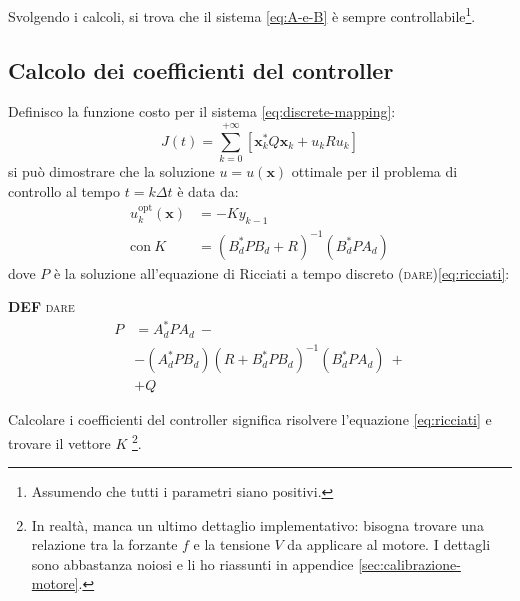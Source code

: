 Svolgendo i calcoli, si trova che il sistema \eqref{eq:A-e-B} è sempre controllabile\footnote{Assumendo che tutti i
parametri siano positivi.}.

\subsection{Calcolo dei coefficienti del controller}\label{calcolo-coefficienti}
Definisco la funzione costo per il sistema \eqref{eq:discrete-mapping}:
\begin{equation}
  J(t) =
  \sum_{k=0}^{+\infty} \left[ \mathbf{x}_k^* Q \mathbf {x}_k + u_k R u_k \right]
  \label{eq:lqr-costo-discreto}
\end{equation}
si può dimostrare\cite{chow1975analysis} che la soluzione $u = u(\mathbf x)$ ottimale per il problema di controllo al tempo $t = k \Delta t$ è data da:
\begin{equation}
  \begin{aligned}
  u_k^{\text{opt}}(\mathbf x) &= -K y_{k-1} \\
  \text{con}\ K &= (B_d^*PB_d + R)^{-1}(B_d^*PA_d)
  \end{aligned}
  \label{eq:f-opt}
\end{equation}
dove $P$ è la soluzione all'equazione di Ricciati a tempo discreto (\textsc{dare})\eqref{eq:ricciati}:%
\begin{framed}
  \textbf{DEF} \textsc{dare}
  \begin{equation}
    \begin{aligned}
    P &=A_d^* P A_d\ - \\
     &-(A_d^* P B_d)(R + B_d^* P B_d)^{-1}(B_d^* P A_d)\ + \\
    &+ Q
    \end{aligned}
    \label{eq:ricciati}
  \end{equation}%
\end{framed}%
Calcolare i coefficienti del controller significa risolvere l'equazione \eqref{eq:ricciati} e trovare il vettore $K$
\footnote{In realtà, manca un ultimo dettaglio implementativo: bisogna trovare una relazione tra la forzante $f$ e
la tensione $V$ da applicare al motore. I dettagli sono abbastanza noiosi e li ho riassunti in appendice \ref{sec:calibrazione-motore}.}.

